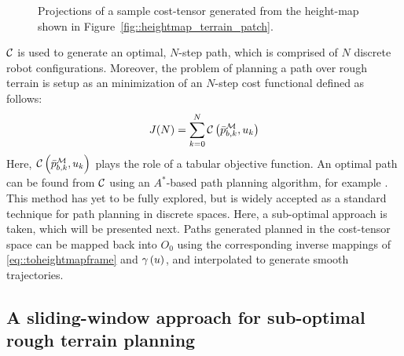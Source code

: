 				\begin{figure}
					\centering
					\caption{Projections of a sample cost-tensor generated from the height-map shown in Figure~\ref{fig::heightmap_terrain_patch}.}
					\label{fig::cost_map}
				\end{figure}

			${\cal C}$ is used to generate an optimal, $N$-step path, which is comprised of $N$ discrete robot configurations. Moreover, the problem of planning a path over rough terrain is setup as an minimization of an $N$-step cost functional defined as follows:
				\begin{equation}			
					J(N) = \sum_{k=0}^N {\cal C}\left(\bar{p}^{{\cal M}}_{b,k},u_{k}\right)
				\end{equation}
			Here, ${\cal C}\left(\bar{p}^{{\cal M}}_{b,k},u_{k}\right)$ plays the role of a tabular objective function. An optimal path can be found from ${\cal C}$ using an $A^{*}$-based path planning algorithm, for example \cite{Hart1968}. This method has yet to be fully explored, but is widely accepted as a standard technique for path planning in discrete spaces. Here, a sub-optimal approach is taken, which will be presented next.  Paths generated planned in the cost-tensor space can be mapped back into $O_{0}$ using the corresponding inverse mappings of \ref{eq::toheightmapframe} and $\gamma\left(u\right)$, and interpolated to generate smooth trajectories.
			


		\subsection{A sliding-window approach for sub-optimal rough terrain planning}

